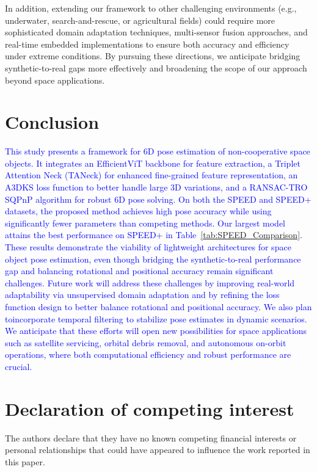 \documentclass[a4paper,fleqn]{cas-sc}
\begin{document}
In addition, extending our framework to other challenging environments (e.g., 
underwater, search-and-rescue, or agricultural fields) could require more sophisticated 
domain adaptation techniques, multi-sensor fusion approaches, and real-time embedded 
implementations to ensure both accuracy and efficiency under extreme conditions. 
By pursuing these directions, we anticipate bridging synthetic-to-real gaps more effectively 
and broadening the scope of our approach beyond space applications.

\section{Conclusion} \label{sec:conclusion}
\textcolor{blue}{
This study presents a framework for 6D pose estimation of non-cooperative space objects. It integrates an EfficientViT backbone for feature extraction, a Triplet Attention Neck (TANeck) for enhanced fine-grained feature representation, an A3DKS loss function to better handle large 3D variations, and a RANSAC-TRO SQPnP algorithm for robust 6D pose solving.
On both the SPEED and SPEED+ datasets, the proposed method achieves high pose accuracy while using significantly fewer parameters than competing methods. Our largest model attains the best performance on SPEED+ in Table~\ref{tab:SPEED_Comparison}. These results demonstrate the viability of lightweight architectures for space object pose estimation, even though bridging the synthetic-to-real performance gap and balancing rotational and positional accuracy remain significant challenges.
Future work will address these challenges by improving real-world adaptability via unsupervised domain adaptation and by refining the loss function design to better balance rotational and positional accuracy. We also plan toincorporate temporal filtering to stabilize pose estimates in dynamic scenarios. We anticipate that these efforts will open new possibilities for space applications such as satellite servicing, orbital debris removal, and autonomous on-orbit operations, where both computational efficiency and robust performance are crucial.
}
\section*{Declaration of competing interest}

The authors declare that they have no known competing financial interests or personal relationships that could have appeared to influence the work reported in this paper.
\end{document}
